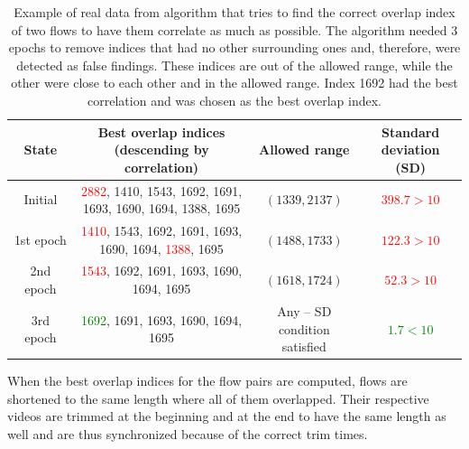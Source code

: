 \begin{table}[!ht]
    \begin{center}
        \begin{tabular}{ |c|c|c|c| }
            \hline
            State & \makecell{Best overlap indices \\ (descending by correlation)} & Allowed range & \makecell{Standard \\ deviation (SD)} \\
            \hline
            \hline
                Initial & \makecell{\textcolor{red}{2882}, 1410, 1543, 1692, 1691,\\1693, 1690, 1694, 1388, 1695} & $(1339, 2137)$ & \textcolor{red}{$398.7 > 10$} \\
            \hline
                1st epoch & \makecell{\textcolor{red}{1410}, 1543, 1692, 1691, 1693,\\1690, 1694, \textcolor{red}{1388}, 1695} & $(1488, 1733)$ & \textcolor{red}{$122.3 > 10$} \\
            \hline
                2nd epoch & \makecell{\textcolor{red}{1543}, 1692, 1691, 1693, 1690,\\1694, 1695} & $(1618, 1724)$ & \textcolor{red}{$52.3 > 10$} \\
            \hline
                3rd epoch & \makecell{\textcolor{green}{1692}, 1691, 1693, 1690, 1694,\\1695} & \makecell{Any -- SD \\ condition satisfied} & \textcolor{green}{$1.7 < 10$} \\
            \hline
        \end{tabular}
    \end{center}
    \caption{Example of real data from algorithm that tries to find the correct overlap index of two flows to have them correlate as much as possible. The algorithm needed 3 epochs to remove indices that had no other surrounding ones and, therefore, were detected as false findings. These indices are out of the allowed range, while the other were close to each other and in the allowed range. Index 1692 had the best correlation and was chosen as the best overlap index.}
    \label{tab:correlation-pick}
\end{table}

When the best overlap indices for the flow pairs are computed, flows are shortened to the same length where all of them overlapped. Their respective videos are trimmed at the beginning and at the end to have the same length as well and are thus synchronized because of the correct trim times.


